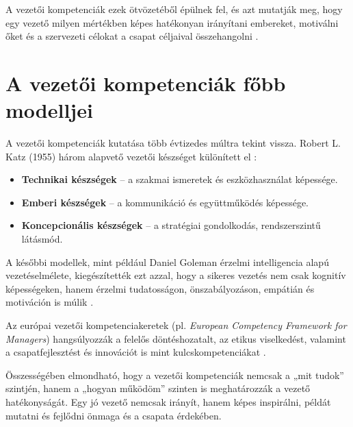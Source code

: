 A vezetői kompetenciák ezek ötvözetéből épülnek fel, és azt mutatják meg, hogy egy vezető milyen mértékben képes hatékonyan irányítani embereket, motiválni őket és a szervezeti célokat a csapat céljaival összehangolni \cite{boyatzis1982}.

\section{A vezetői kompetenciák főbb modelljei}

A vezetői kompetenciák kutatása több évtizedes múltra tekint vissza. 
Robert L. Katz (1955) három alapvető vezetői készséget különített el \cite{katz1955}:

\begin{itemize}
    \item \textbf{Technikai készségek} – a szakmai ismeretek és eszközhasználat képessége.
    \item \textbf{Emberi készségek} – a kommunikáció és együttműködés képessége.
    \item \textbf{Koncepcionális készségek} – a stratégiai gondolkodás, rendszerszintű látásmód.
\end{itemize}

A későbbi modellek, mint például Daniel Goleman érzelmi intelligencia alapú vezetéselmélete, 
kiegészítették ezt azzal, hogy a sikeres vezetés nem csak kognitív képességeken, 
hanem érzelmi tudatosságon, önszabályozáson, empátián és motiváción is múlik \cite{goleman1998}. 

Az európai vezetői kompetenciakeretek (pl. \textit{European Competency Framework for Managers}) 
hangsúlyozzák a felelős döntéshozatalt, az etikus viselkedést, valamint a csapatfejlesztést és innovációt is mint kulcskompetenciákat \cite{ecfm2010}.

Összességében elmondható, hogy a vezetői kompetenciák nemcsak a „mit tudok” szintjén, 
hanem a „hogyan működöm” szinten is meghatározzák a vezető hatékonyságát. 
Egy jó vezető nemcsak irányít, hanem képes inspirálni, példát mutatni és fejlődni önmaga és a csapata érdekében.